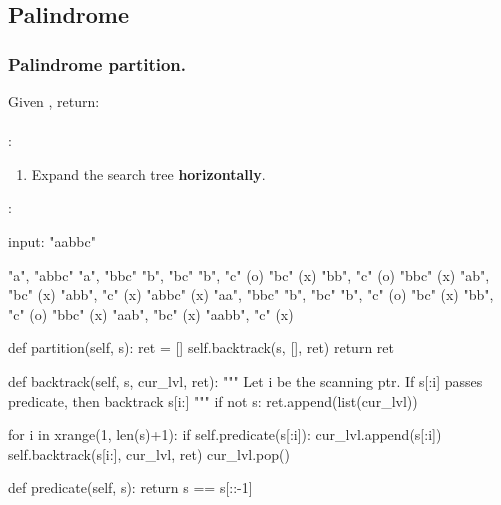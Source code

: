 \subsection{Palindrome}
\subsubsection{Palindrome partition.} Given , return: \\
\pyinline{[["aa","b"], ["a","a","b"]]}
\\
:
\begin{enumerate}
\item Expand the search tree \textbf{horizontally}.
\end{enumerate}
:
\begin{python}
input: "aabbc"

"a", "abbc"
     "a", "bbc"
          "b", "bc"
               "b", "c" (o)
               "bc" (x)
          "bb", "c" (o)
          "bbc" (x)
     "ab", "bc" (x)
     "abb", "c" (x)
     "abbc" (x)
"aa", "bbc"
      "b", "bc"
           "b", "c" (o)
           "bc" (x)
      "bb", "c" (o)
      "bbc" (x)
"aab", "bc" (x)
"aabb", "c" (x)
\end{python}
\begin{python}
def partition(self, s):
    ret = []
    self.backtrack(s, [], ret)
    return ret

def backtrack(self, s, cur_lvl, ret):
    """
    Let i be the scanning ptr.
    If s[:i] passes predicate, then backtrack s[i:]
    """
    if not s:
        ret.append(list(cur_lvl))

    for i in xrange(1, len(s)+1):
        if self.predicate(s[:i]):
            cur_lvl.append(s[:i])
            self.backtrack(s[i:], cur_lvl, ret)
            cur_lvl.pop()

def predicate(self, s):
    return s == s[::-1]
\end{python}
